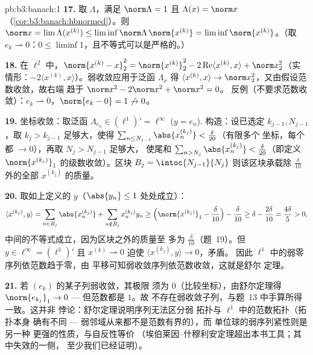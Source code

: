 \begin{solution}{pb:b3:banach:1}
\textbf{17.} 取 $\Lambda$，满足 $\norm\Lambda = 1$ 且
$\Lambda(x) = \norm x$（\cref{cor:b3:banach:hbnormed}）。则
$\norm x = \lim\Lambda(x^{(k)}) \leq
\liminf\norm\Lambda\,\norm{x^{(k)}} =
\liminf\norm{x^{(k)}}$。（取 $e_k \rightharpoonup 0$：$0
\leq \liminf 1$，且不等式可以是严格的。）

\textbf{18.} 在 $\ell^2$ 中，$\norm{x^{(k)} - x}_2^2 =
\norm{x^{(k)}}_2^2 - 2\operatorname{Re}\langle x^{(k)},
x\rangle + \norm x_2^2$（实情形：$-2\langle x^{(k)},
x\rangle$）。弱收敛应用于泛函
$\Lambda_x$ 得 $\langle x^{(k)}, x\rangle \to \norm
x_2^2$，又由假设范数收敛，故右端
趋于 $\norm x^2 - 2\norm x^2 + \norm x^2 = 0$。
反例（不要求范数收敛）：$e_k
\rightharpoonup 0$，$\norm{e_k - 0} = 1 \not\to 0$。

\textbf{19.} 坐标收敛：取泛函
$\Lambda_{e_n} \in (\ell^1)' = \ell^\infty$ ($y = e_n$).
构造：设已选定 $k_{j-1}, N_{j-1}$，取 $k_j >
k_{j-1}$ 足够大，使得 $\sum_{n \leq
N_{j-1}}\abs{x^{(k_j)}_n} < \frac\delta{20}$（有限多个
坐标，每个都 $\to 0$），再取 $N_j > N_{j-1}$ 足够大，
使尾和 $\sum_{n > N_j}\abs{x^{(k_j)}_n} <
\frac\delta{20}$（即定义
$\norm{x^{(k_j)}}_1$ 的级数收敛）。区块 $B_j = \intoc{N_{j-1}}{N_j}$
则该区块承载除 $\frac\delta{10}$ 外的全部
$x^{(k_j)}$ 的质量。

\textbf{20.} 取如上定义的 $y$（$\abs{y_n} \leq 1$
处处成立）：
\[
\langle x^{(k_j)}, y\rangle
= \sum_{n \in B_j}\abs{x^{(k_j)}_n}
+ \sum_{n \notin B_j}x^{(k_j)}_ny_n
\geq \Bigl(\norm{x^{(k_j)}}_1 - \frac\delta{10}\Bigr) -
\frac\delta{10}
\geq \delta - \frac{2\delta}{10} = \frac{4\delta}5 > 0,
\]
中间的不等式成立，因为区块之外的质量至
多为 $\frac\delta{10}$（题~19）。但 $y \in
\ell^\infty = (\ell^1)'$ 且 $x^{(k)} \rightharpoonup 0$
迫使 $\langle x^{(k_j)}, y\rangle \to 0$，矛盾。
因此 $\ell^1$ 中的弱零序列依范数趋于零，由
平移可知弱收敛序列依范数收敛，这就是舒尔
定理。

\textbf{21.} 若 $(e_k)$ 的某子列弱收敛，其极限
须为 $0$（比较坐标），由舒尔定理得 $\norm{e_{k_j}}_1
\to 0$ --- 但范数都是 $1$。故
不存在弱收敛子列，与题~13 中手算所得一致。这并非
悖论：舒尔定理说明序列无法区分弱
拓扑与 $\ell^1$ 中的范数拓扑（拓扑本身
确有不同 --- 弱邻域从来都不是范数有界的），而
单位球的弱序列紧性则是另一种
更强的性质，与自反性等价
（埃伯莱因–什穆利安定理超出本书工具；其中失效的一侧，
至少我们已经证明）。


\end{solution}
